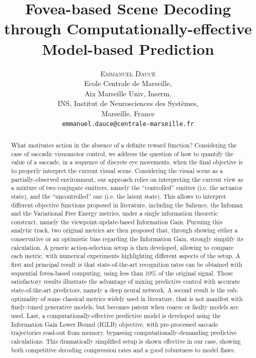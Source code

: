 \documentclass[12pt,twoside,openright]{article}
\title{\textbf{Fovea-based Scene Decoding through Computationally-effective Model-based Prediction}}
\author{\textsc{Emmanuel Daucé}\\
	Ecole Centrale de Marseille,\\ 
	Aix Marseille Univ, Inserm,\\ 
	INS, Institut de Neurosciences des Systèmes, \\
	Marseille, France\\
	\texttt{emmanuel.dauce@centrale-marseille.fr} 
}%
\date{}
\begin{document}
	
\maketitle
	
\begin{abstract}
{\color{Purple} What motivates action in the absence of a definite reward function? Considering the case of saccadic visuomotor control, we address the question of how to quantify the value of a saccade, in a sequence of discrete eye movements, when the final objective is to properly interpret the current visual scene.
Considering the visual scene as a partially-observed environment,
our approach  relies on interpreting the current view as a mixture of two conjugate emitters, namely the ``controlled'' emitter (i.e. the actuator state), and the ``uncontrolled'' one (i.e. the latent state). 
This allows to interpret different objective functions proposed in literature, 
including the Salience, the Infomax and the Variational Free Energy metrics, under a single information theoretic construct, namely the viewpoint-update-based Information Gain.
Pursuing this analytic track, two original metrics are then proposed that, through showing either a conservative or an optimistic bias regarding the Information Gain, strongly simplify its calculation.
A generic action-selection setup is then developed, allowing to compare each metric,}
with numerical experiments highlighting different aspects of the setup. 
A first and principal result is that state-of-the-art recognition rates can be obtained with sequential fovea-based computing, using less than 10\% of the original signal. Those satisfactory results illustrate the advantage of mixing predictive control with accurate state-of-the-art predictors, namely a deep neural network. 
A second result is the sub-optimality of some classical metrics widely used in literature, that is not manifest with finely-tuned generative models, but becomes patent when coarse or faulty models are used.
Last, a computationally-effective predictive model is developed using the {\color{Purple} Information Gain Lower Bound (IGLB)} objective, with pre-processed saccade trajectories read-out from memory, bypassing computationally-demanding predictive calculations.  This dramatically simplified setup is shown effective in our case, showing both competitive decoding compression rates and a good robustness to model flaws. 

\end{abstract}
\end{document}

